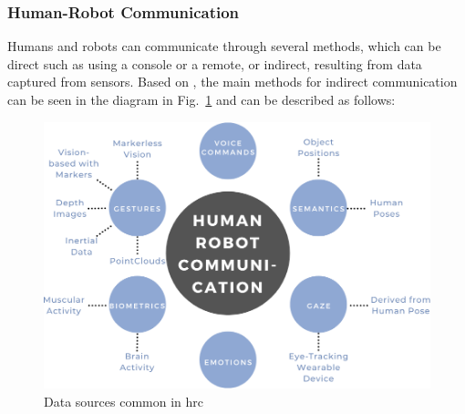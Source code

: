 \subsubsection{Human-Robot Communication}

Humans and robots can communicate through several methods, which can be direct such as using a console or a remote, or indirect, resulting from data captured from sensors. Based on \cite{Castro2021, Mukherjee2022, Semeraro2023,}, the main methods for indirect communication can be seen in the diagram in Fig.~\ref{interaction} and can be described as follows:

\begin{figure}[ht]
\centering
\includegraphics[width=5.5in]{figs/interaction.png}

\caption{Data sources common in \acl{hrc}}
\label{interaction}
\end{figure}

